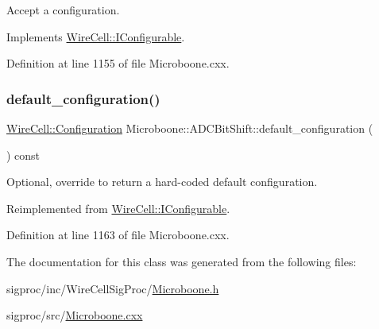 Accept a configuration. 



Implements \hyperlink{class_wire_cell_1_1_i_configurable_a57ff687923a724093df3de59c6ff237d}{Wire\+Cell\+::\+I\+Configurable}.



Definition at line 1155 of file Microboone.\+cxx.

\mbox{\label{class_wire_cell_1_1_sig_proc_1_1_microboone_1_1_a_d_c_bit_shift_a6e3cf4cabba9a0490ddcca9b2c4f9b20}} 
\subsubsection{\texorpdfstring{default\+\_\+configuration()}{default\_configuration()}}
{\footnotesize\ttfamily \hyperlink{namespace_wire_cell_a9f705541fc1d46c608b3d32c182333ee}{Wire\+Cell\+::\+Configuration} Microboone\+::\+A\+D\+C\+Bit\+Shift\+::default\+\_\+configuration (\begin{DoxyParamCaption}{ }\end{DoxyParamCaption}) const\hspace{0.3cm}{\ttfamily [virtual]}}



Optional, override to return a hard-\/coded default configuration. 



Reimplemented from \hyperlink{class_wire_cell_1_1_i_configurable_a54841b2da3d1ea02189478bff96f7998}{Wire\+Cell\+::\+I\+Configurable}.



Definition at line 1163 of file Microboone.\+cxx.



The documentation for this class was generated from the following files\+:\begin{DoxyCompactItemize}
\item 
sigproc/inc/\+Wire\+Cell\+Sig\+Proc/\hyperlink{_microboone_8h}{Microboone.\+h}\item 
sigproc/src/\hyperlink{_microboone_8cxx}{Microboone.\+cxx}\end{DoxyCompactItemize}

